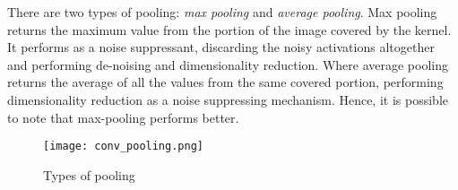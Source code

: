 There are two types of pooling: \textit{max pooling} and \textit{average pooling}. Max pooling returns the maximum value from the portion of the image covered by the kernel. It performs as a noise suppressant, discarding the noisy activations altogether and performing de-noising and dimensionality reduction. Where average pooling returns the average of all the values from the same covered portion, performing dimensionality reduction as a noise suppressing mechanism. Hence, it is possible to note that max-pooling performs better.\cite{compguideCnn}

\begin{figure}[h]
	\centering
    \texttt{[image: conv\_pooling.png]}
	\caption{Types of pooling \cite{compguideCnn}}
	\label{fig:cnn_pooling}
\end{figure}
